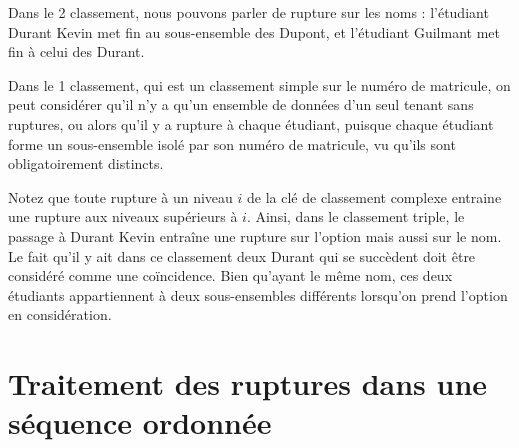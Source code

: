 	
	Dans le 2\ieme{} classement, nous pouvons parler de
	rupture sur les noms : l’étudiant Durant Kevin met fin au sous-ensemble
	des Dupont, et l’étudiant Guilmant met fin à celui des Durant.
		
	Dans le 1\ier{} classement, qui est un classement simple
	sur le numéro de matricule, on peut considérer qu’il n’y a qu’un
	ensemble de données d’un seul tenant sans ruptures, ou alors qu’il y a
	rupture à chaque étudiant, puisque chaque étudiant forme un
	sous-ensemble isolé par son numéro de matricule, vu qu’ils sont
	obligatoirement distincts.
	
	Notez que toute rupture à un niveau $i$ de la clé de classement complexe
	entraine une rupture aux niveaux supérieurs à $i$. Ainsi, dans le
	classement triple, le passage à Durant Kevin entraîne une rupture sur
	l’option mais aussi sur le nom. Le fait qu’il y ait dans ce classement
	deux Durant qui se succèdent doit être considéré comme une coïncidence.
	Bien qu’ayant le même nom, ces deux étudiants appartiennent à deux
	sous-ensembles différents lorsqu’on prend l’option en considération.
	


\section{Traitement des ruptures dans une séquence ordonnée}

